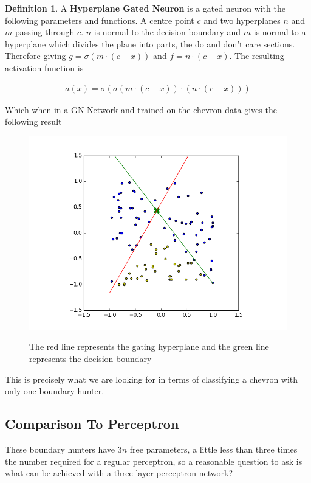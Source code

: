 \documentclass[notitlepage]{report}
\theoremstyle{definition}
\newtheorem{definition}{Definition}[section]
\begin{document}
\theoremstyle{definition}
\begin{definition}
A \textbf{Hyperplane Gated Neuron} is a gated neuron with the following parameters and functions. A centre point $c$ and two hyperplanes $n$ and $m$ passing through $c$. $n$ is normal to the decision boundary and $m$ is normal to a hyperplane which divides the plane into parts, the do and don't care sections. Therefore giving $g = \sigma(m \cdot (c - x))$ and $f = n \cdot (c - x)$. The resulting activation function is

\begin{align}
a(x) = \sigma(\sigma(m \cdot (c - x)) \cdot (n \cdot (c - x)))
\end{align}

\end{definition}

Which when in a GN Network and trained on the chevron data gives the following result

\begin{figure}[H]
  \centering
  \begin{minipage}[b]{0.7\textwidth}
    \includegraphics[width=\textwidth]{GN-MH-01.png}
    \caption{}
  \end{minipage}
  \hfill

The red line represents the gating hyperplane and the green line represents the decision boundary
\end{figure}

This is precisely what we are looking for in terms of classifying a chevron with only one boundary hunter.

\subsection{Comparison To Perceptron}
These boundary hunters have $3n$ free parameters, a little less than three times the number required for a regular perceptron, so a reasonable question to ask is what can be achieved with a three layer perceptron network?\\
\end{document}
